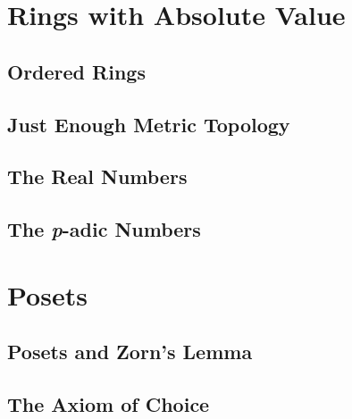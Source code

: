 \documentclass{memoir}
\begin{document}
\setcounter{dummycounter}{\value{section}}%
\appendix
\setcounter{section}{\value{dummycounter}}%

  \chapter{Rings with Absolute Value}
    \label{chap:abs-val}
    
    \newpage

    \section{Ordered Rings}
      \label{sec:ordered-rings}
      
      \newpage

    \section{Just Enough Metric Topology}
      \label{sec:ring-with-abs-val}
      
      \newpage

    \section{The Real Numbers}
      \label{sec:reals}
      
      \newpage

    \section{The \emph{p}-adic Numbers}

  \chapter{Posets}
    \newpage

    \section{Posets and Zorn's Lemma}
      \label{sec:zorn}
      
      \newpage

    \section{The Axiom of Choice}


\backmatter
  \printindex
\end{document}
